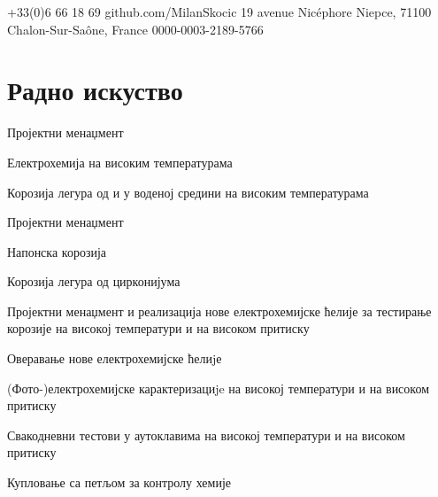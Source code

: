 \documentclass[11pt, a4paper, notitlepage]{article}
\begin{document}
\selectfont
\pagestyle{empty}
	\newpage

	
	
	{+33(0)6 66 18 69}
	{github.com/MilanSkocic}
	{19 avenue Nicéphore Niepce, 71100 Chalon-Sur-Saône, France}
	{0000-0003-2189-5766}

	\section*{Радно искуство}

	\begin{jobdetails}[T2A]
		\item Пројектни менаџмент
 		\item Електрохемија на високим температурама
		\item Корозија легура од  и  у воденој средини на високим температурама
	\end{jobdetails}
		
	\begin{jobdetails}[T2A]
		\item Пројектни менаџмент
		\item Напонска корозија 
		\item Корозија легура од цирконијума
	\end{jobdetails}

	\begin{jobdetails}[T2A]
		\item Пројектни менаџмент и реализација нове електрохемијске ћелије за тестирање корозије на високој температури и на високом притиску
		\item Оверавање нове електрохемијске ћелиjе
		\item (Фото-)електрохемијске карактеризациje на високој температури и на високом притиску
		\item Свакодневни тестови у аутоклавима на високој температури и на високом притиску
		\item Купловање са петљом за контролу хемије
	\end{jobdetails}
	
\end{document}
